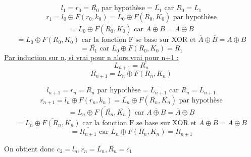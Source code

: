 \documentclass[fleqn]{article}
\begin{document}
\[l_1 = r_0 = \overline{R_0} \text{ par hypothèse} = \boxed{\overline{L_1}} \text{ car } R_0 = L_1\] 
\[r_1 = l_0 \oplus F(r_0, k_0) = \overline{L_0} \oplus F(\overline{R_0}, \overline{K_0}) \text{ par hypothèse}\]
\[= \overline{L_0 \oplus F(\overline{R_0}, \overline{K_0})} \text{ car } \overline{A \oplus B} = \overline{A} \oplus B\]
\[= \overline{L_0 \oplus F(R_0, K_0)} \text{ car la fonction F se base sur XOR et } \overline{A} \oplus \overline{B} = A \oplus B\]
\[= \boxed{\overline{R_1}} \text{ car } L_0 \oplus F(R_0, K_0) = R_1\]
\newline\newline
\underline{Par induction sur n, si vrai pour n alors vrai pour n+1 :}\newline
\[L_{n+1} = R_n\]
\[R_{n+1} = L_n \oplus F(R_n, K_n)\]

\[l_{n+1} = r_n = \overline{R_n} \text{ par hypothèse} = \boxed{\overline{L_{n+1}}} \text{ car } R_n = L_{n+1}\] 
\[r_{n+1} = l_n \oplus F(r_n, k_n) = \overline{L_n} \oplus F(\overline{R_n}, \overline{K_n}) \text{ par hypothèse}\]
\[= \overline{L_n \oplus F(\overline{R_n}, \overline{K_n})} \text{ car } \overline{A \oplus B} = \overline{A} \oplus B\]
\[= \overline{L_n \oplus F(R_n, K_n)} \text{ car la fonction F se base sur XOR et } \overline{A} \oplus \overline{B} = A \oplus B\]
\[= \boxed{\overline{R_{n+1}}} \text{ car } L_n \oplus F(R_n, K_n) = R_{n+1}\]\newline

\noindent On obtient donc $\boxed{c_2 = l_n, r_n = \overline{L_n}, \overline{R_n} = \overline{c_1}}$
\section{\normalsize}
\end{document}
